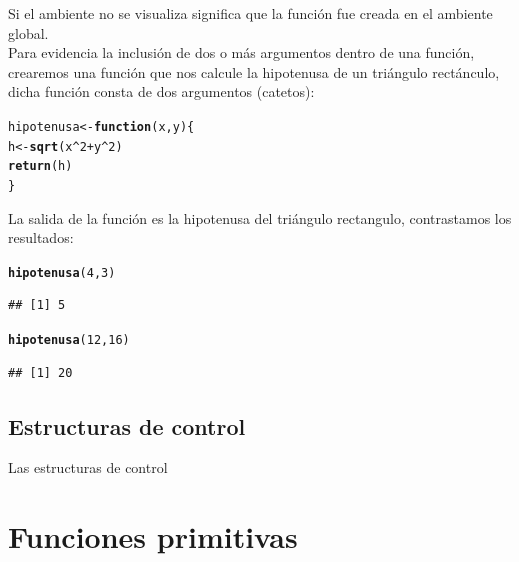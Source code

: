 \documentclass[11pt,a4paper,oneside]{book}\usepackage[]{graphicx}\usepackage[]{color}
\makeatletter
\newcommand{\hlnum}[1]{\textcolor[rgb]{0.686,0.059,0.569}{#1}}%
\newcommand{\hlopt}[1]{\textcolor[rgb]{0,0,0}{#1}}%
\newcommand{\hlstd}[1]{\textcolor[rgb]{0.345,0.345,0.345}{#1}}%
\newcommand{\hlkwa}[1]{\textcolor[rgb]{0.161,0.373,0.58}{\textbf{#1}}}%
\newcommand{\hlkwb}[1]{\textcolor[rgb]{0.69,0.353,0.396}{#1}}%
\newcommand{\hlkwc}[1]{\textcolor[rgb]{0.333,0.667,0.333}{#1}}%
\newcommand{\hlkwd}[1]{\textcolor[rgb]{0.737,0.353,0.396}{\textbf{#1}}}%
\newenvironment{kframe}{%
 \def\at@end@of@kframe{}%
 \ifinner\ifhmode%
  \def\at@end@of@kframe{\end{minipage}}%
  \begin{minipage}{\columnwidth}%
 \fi\fi%
 \def\FrameCommand##1{\hskip\@totalleftmargin \hskip-\fboxsep
 \colorbox{shadecolor}{##1}\hskip-\fboxsep
     \hskip-\linewidth \hskip-\@totalleftmargin \hskip\columnwidth}%
 \MakeFramed {\advance\hsize-\width
   \@totalleftmargin\z@ \linewidth\hsize
   \@setminipage}}%
 {\par\unskip\endMakeFramed%
 \at@end@of@kframe}
\newenvironment{knitrout}{}{} %
\makeatother
\begin{document}
\begin{itemize}
Si el ambiente no se visualiza significa que la función fue creada en el ambiente global.\\

Para evidencia la inclusión de dos o más argumentos dentro de una función, crearemos una función que nos calcule la hipotenusa de un triángulo rectánculo, dicha función consta de dos argumentos (catetos):
\begin{knitrout}
\color{fgcolor}\begin{kframe}
\begin{alltt}
\hlstd{hipotenusa} \hlkwb{<-} \hlkwa{function}\hlstd{(}\hlkwc{x}\hlstd{,}\hlkwc{y}\hlstd{)\{}
   \hlstd{h} \hlkwb{<-} \hlkwd{sqrt}\hlstd{(x}\hlopt{^}\hlnum{2} \hlopt{+} \hlstd{y}\hlopt{^}\hlnum{2}\hlstd{)}
   \hlkwd{return}\hlstd{(h)}
\hlstd{\}}
\end{alltt}
\end{kframe}
\end{knitrout}

La salida de la función es la hipotenusa del triángulo rectangulo, contrastamos los resultados:
\begin{knitrout}
\color{fgcolor}\begin{kframe}
\begin{alltt}
\hlkwd{hipotenusa}\hlstd{(}\hlnum{4}\hlstd{,}\hlnum{3}\hlstd{)}
\end{alltt}
\begin{verbatim}
## [1] 5
\end{verbatim}
\begin{alltt}
\hlkwd{hipotenusa}\hlstd{(}\hlnum{12}\hlstd{,} \hlnum{16}\hlstd{)}
\end{alltt}
\begin{verbatim}
## [1] 20
\end{verbatim}
\end{kframe}
\end{knitrout}

\subsection{Estructuras de control}

Las estructuras de control 


\section{Funciones primitivas}


\end{itemize}
\end{document}
